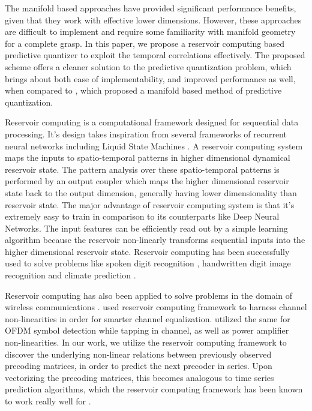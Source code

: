 \documentclass[conference]{IEEEtran}
\begin{document}
The manifold based approaches have provided significant performance benefits, given that they work with effective lower dimensions.
However, these approaches are difficult to implement and require some familiarity with manifold geometry for a complete grasp.
In this paper, we propose a reservoir computing based predictive quantizer to exploit the temporal correlations effectively.
The proposed scheme offers a cleaner solution to the predictive quantization problem, which brings about both ease of implementability, and improved performance as well, when compared to \cite{6891198}, which proposed a manifold based method of predictive quantization.

Reservoir computing is a computational framework designed for sequential data processing. 
It's design takes inspiration from several frameworks of recurrent neural networks \cite{jaeger2004harnessing} including Liquid State Machines \cite{jalalvand2015real}. 
A reservoir computing system maps the inputs to spatio-temporal patterns in higher dimensional dynamical reservoir state. 
The pattern analysis over these spatio-temporal patterns is performed by an output coupler which maps the higher dimensional reservoir state back to the output dimension, generally having lower dimensionality than reservoir state. 
The major advantage of reservoir computing system is that it’s extremely easy to train in comparison to its counterparts like Deep Neural Networks. 
The input features can be efficiently read out by a simple learning algorithm because the reservoir non-linearly transforms sequential inputs into the higher dimensional reservoir state. 
Reservoir computing has been successfully used to solve problems like spoken digit recognition \cite{verstraeten2005isolated}, handwritten digit image recognition \cite{jalalvand2015real} and climate prediction \cite{pathak2017using}.  

Reservoir computing has also been applied to solve problems in the domain of wireless communications \cite{jaeger2004harnessing,mosleh2017brain,shafin2018realizing}. 
\cite{jaeger2004harnessing} used reservoir computing framework to harness channel non-linearities in order for smarter channel equalization.
\cite{mosleh2017brain,shafin2018realizing} utilized the same for OFDM symbol detection while tapping in channel, as well as power amplifier non-linearities.
In our work, we utilize the reservoir computing framework to discover the underlying non-linear relations between previously observed precoding matrices, in order to predict the next precoder in series. Upon vectorizing the precoding matrices, this becomes analogous to time series prediction algorithms, which the reservoir computing framework has been known to work really well for \cite{mosleh2017brain}.
\end{document}
